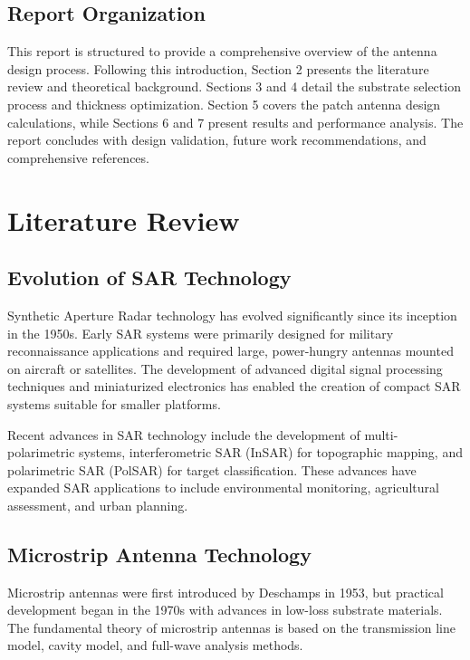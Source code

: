 \documentclass[12pt]{article}
\begin{document}
\subsection{Report Organization}

This report is structured to provide a comprehensive overview of the antenna design process. Following this introduction, Section 2 presents the literature review and theoretical background. Sections 3 and 4 detail the substrate selection process and thickness optimization. Section 5 covers the patch antenna design calculations, while Sections 6 and 7 present results and performance analysis. The report concludes with design validation, future work recommendations, and comprehensive references.

\section{Literature Review}

\subsection{Evolution of SAR Technology}

Synthetic Aperture Radar technology has evolved significantly since its inception in the 1950s. Early SAR systems were primarily designed for military reconnaissance applications and required large, power-hungry antennas mounted on aircraft or satellites. The development of advanced digital signal processing techniques and miniaturized electronics has enabled the creation of compact SAR systems suitable for smaller platforms.

Recent advances in SAR technology include the development of multi-polarimetric systems, interferometric SAR (InSAR) for topographic mapping, and polarimetric SAR (PolSAR) for target classification. These advances have expanded SAR applications to include environmental monitoring, agricultural assessment, and urban planning.

\subsection{Microstrip Antenna Technology}

Microstrip antennas were first introduced by Deschamps in 1953, but practical development began in the 1970s with advances in low-loss substrate materials. The fundamental theory of microstrip antennas is based on the transmission line model, cavity model, and full-wave analysis methods.
\end{document}
